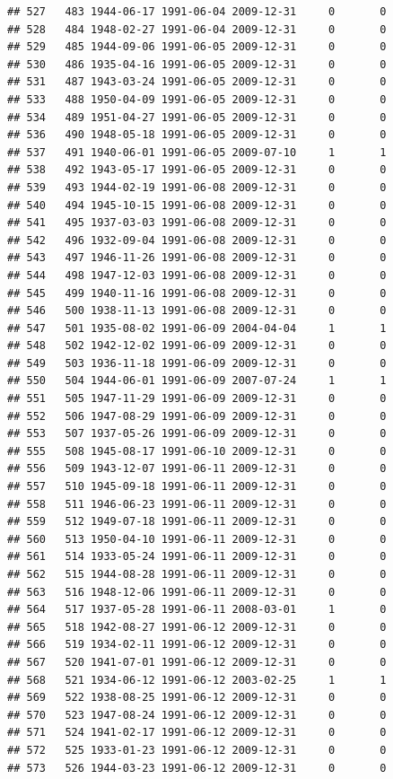 \documentclass[
]{book}
\theoremstyle{definition}
\theoremstyle{definition}
\theoremstyle{definition}
\theoremstyle{definition}
\theoremstyle{remark}
\begin{document}
\begin{verbatim}
## 527   483 1944-06-17 1991-06-04 2009-12-31     0       0
## 528   484 1948-02-27 1991-06-04 2009-12-31     0       0
## 529   485 1944-09-06 1991-06-05 2009-12-31     0       0
## 530   486 1935-04-16 1991-06-05 2009-12-31     0       0
## 531   487 1943-03-24 1991-06-05 2009-12-31     0       0
## 533   488 1950-04-09 1991-06-05 2009-12-31     0       0
## 534   489 1951-04-27 1991-06-05 2009-12-31     0       0
## 536   490 1948-05-18 1991-06-05 2009-12-31     0       0
## 537   491 1940-06-01 1991-06-05 2009-07-10     1       1
## 538   492 1943-05-17 1991-06-05 2009-12-31     0       0
## 539   493 1944-02-19 1991-06-08 2009-12-31     0       0
## 540   494 1945-10-15 1991-06-08 2009-12-31     0       0
## 541   495 1937-03-03 1991-06-08 2009-12-31     0       0
## 542   496 1932-09-04 1991-06-08 2009-12-31     0       0
## 543   497 1946-11-26 1991-06-08 2009-12-31     0       0
## 544   498 1947-12-03 1991-06-08 2009-12-31     0       0
## 545   499 1940-11-16 1991-06-08 2009-12-31     0       0
## 546   500 1938-11-13 1991-06-08 2009-12-31     0       0
## 547   501 1935-08-02 1991-06-09 2004-04-04     1       1
## 548   502 1942-12-02 1991-06-09 2009-12-31     0       0
## 549   503 1936-11-18 1991-06-09 2009-12-31     0       0
## 550   504 1944-06-01 1991-06-09 2007-07-24     1       1
## 551   505 1947-11-29 1991-06-09 2009-12-31     0       0
## 552   506 1947-08-29 1991-06-09 2009-12-31     0       0
## 553   507 1937-05-26 1991-06-09 2009-12-31     0       0
## 555   508 1945-08-17 1991-06-10 2009-12-31     0       0
## 556   509 1943-12-07 1991-06-11 2009-12-31     0       0
## 557   510 1945-09-18 1991-06-11 2009-12-31     0       0
## 558   511 1946-06-23 1991-06-11 2009-12-31     0       0
## 559   512 1949-07-18 1991-06-11 2009-12-31     0       0
## 560   513 1950-04-10 1991-06-11 2009-12-31     0       0
## 561   514 1933-05-24 1991-06-11 2009-12-31     0       0
## 562   515 1944-08-28 1991-06-11 2009-12-31     0       0
## 563   516 1948-12-06 1991-06-11 2009-12-31     0       0
## 564   517 1937-05-28 1991-06-11 2008-03-01     1       0
## 565   518 1942-08-27 1991-06-12 2009-12-31     0       0
## 566   519 1934-02-11 1991-06-12 2009-12-31     0       0
## 567   520 1941-07-01 1991-06-12 2009-12-31     0       0
## 568   521 1934-06-12 1991-06-12 2003-02-25     1       1
## 569   522 1938-08-25 1991-06-12 2009-12-31     0       0
## 570   523 1947-08-24 1991-06-12 2009-12-31     0       0
## 571   524 1941-02-17 1991-06-12 2009-12-31     0       0
## 572   525 1933-01-23 1991-06-12 2009-12-31     0       0
## 573   526 1944-03-23 1991-06-12 2009-12-31     0       0

\end{verbatim}
\end{document}

